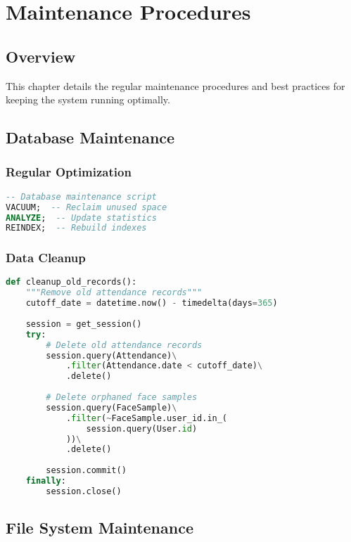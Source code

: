 \chapter{Maintenance Procedures}

\section{Overview}
This chapter details the regular maintenance procedures and best practices for keeping the system running optimally.

\section{Database Maintenance}

\subsection{Regular Optimization}
\begin{lstlisting}[language=SQL]
-- Database maintenance script
VACUUM;  -- Reclaim unused space
ANALYZE;  -- Update statistics
REINDEX;  -- Rebuild indexes
\end{lstlisting}

\subsection{Data Cleanup}
\begin{lstlisting}[language=Python]
def cleanup_old_records():
    """Remove old attendance records"""
    cutoff_date = datetime.now() - timedelta(days=365)
    
    session = get_session()
    try:
        # Delete old attendance records
        session.query(Attendance)\
            .filter(Attendance.date < cutoff_date)\
            .delete()
            
        # Delete orphaned face samples
        session.query(FaceSample)\
            .filter(~FaceSample.user_id.in_(
                session.query(User.id)
            ))\
            .delete()
            
        session.commit()
    finally:
        session.close()
\end{lstlisting}

\section{File System Maintenance}

